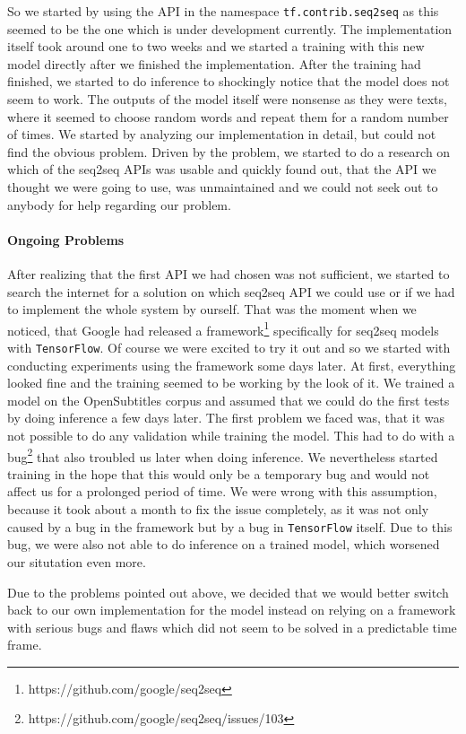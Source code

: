 So we started by using the API in the namespace \texttt{tf.contrib.seq2seq} as this seemed to be the one which is under development currently. The implementation itself took around one to two weeks and we started a training with this new model directly after we finished the implementation. After the training had finished, we started to do inference to shockingly notice that the model does not seem to work. The outputs of the model itself were nonsense as they were texts, where it seemed to choose random words and repeat them for a random number of times. We started by analyzing our implementation in detail, but could not find the obvious problem. Driven by the problem, we started to do a research on which of the seq2seq APIs was usable and quickly found out, that the API we thought we were going to use, was unmaintained and we could not seek out to anybody for help regarding our problem.

\paragraph{Ongoing Problems} After realizing that the first API we had chosen was not sufficient, we started to search the internet for a solution on which seq2seq API we could use or if we had to implement the whole system by ourself. That was the moment when we noticed, that Google had released a framework\footnote{https://github.com/google/seq2seq} specifically for seq2seq models with \texttt{TensorFlow}. Of course we were excited to try it out and so we started with conducting experiments using the framework some days later. At first, everything looked fine and the training seemed to be working by the look of it. We trained a model on the OpenSubtitles corpus and assumed that we could do the first tests by doing inference a few days later. The first problem we faced was, that it was not possible to do any validation while training the model. This had to do with a bug\footnote{https://github.com/google/seq2seq/issues/103} that also troubled us later when doing inference. We nevertheless started training in the hope that this would only be a temporary bug and would not affect us for a prolonged period of time. We were wrong with this assumption, because it took about a month to fix the issue completely, as it was not only caused by a bug in the framework but by a bug in \texttt{TensorFlow} itself. Due to this bug, we were also not able to do inference on a trained model, which worsened our situtation even more.

Due to the problems pointed out above, we decided that we would better switch back to our own implementation for the model instead on relying on a framework with serious bugs and flaws which did not seem to be solved in a predictable time frame.

